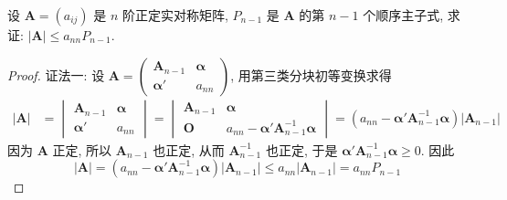 \documentclass[../../main.tex]{subfiles}
\begin{document}
\begin{proposition}\label{proposition:关于正定阵的行列式的不等式}
设 \(\boldsymbol{A}=(a_{ij})\) 是 \(n\) 阶正定实对称矩阵, \(P_{n - 1}\) 是 \(\boldsymbol{A}\) 的第 \(n - 1\) 个顺序主子式, 求证: \(|\boldsymbol{A}|\leqslant  a_{nn}P_{n - 1}\).
\end{proposition}
\begin{proof}
{\color{blue}证法一:}
设 \(\boldsymbol{A}=\begin{pmatrix}\boldsymbol{A}_{n - 1}&\boldsymbol{\alpha}\\\boldsymbol{\alpha}'&a_{nn}\end{pmatrix}\), 用第三类分块初等变换求得
\begin{align*}
|\boldsymbol{A}|&=\begin{vmatrix}\boldsymbol{A}_{n - 1}&\boldsymbol{\alpha}\\\boldsymbol{\alpha}'&a_{nn}\end{vmatrix}=\begin{vmatrix}\boldsymbol{A}_{n - 1}&\boldsymbol{\alpha}\\\boldsymbol{O}&a_{nn}-\boldsymbol{\alpha}'\boldsymbol{A}_{n - 1}^{-1}\boldsymbol{\alpha}\end{vmatrix}=(a_{nn}-\boldsymbol{\alpha}'\boldsymbol{A}_{n - 1}^{-1}\boldsymbol{\alpha})|\boldsymbol{A}_{n - 1}|
\end{align*}
因为 \(\boldsymbol{A}\) 正定, 所以 \(\boldsymbol{A}_{n - 1}\) 也正定, 从而 \(\boldsymbol{A}_{n - 1}^{-1}\) 也正定, 于是 \(\boldsymbol{\alpha}'\boldsymbol{A}_{n - 1}^{-1}\boldsymbol{\alpha}\geqslant 0\). 因此
\[|\boldsymbol{A}|=(a_{nn}-\boldsymbol{\alpha}'\boldsymbol{A}_{n - 1}^{-1}\boldsymbol{\alpha})|\boldsymbol{A}_{n - 1}|\leqslant  a_{nn}|\boldsymbol{A}_{n - 1}|=a_{nn}P_{n - 1}\]


\end{proof}
\end{document}

